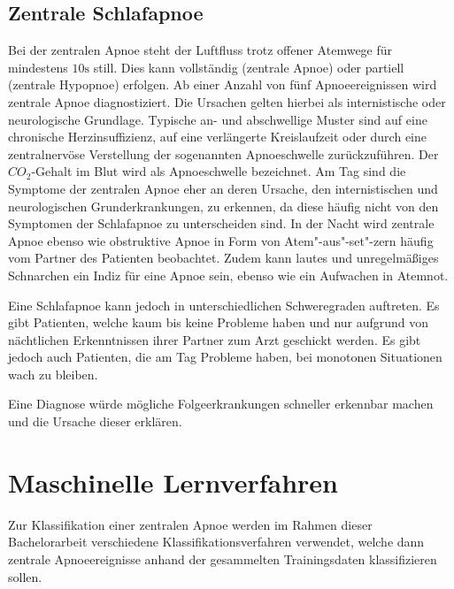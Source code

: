 \subsection{Zentrale Schlafapnoe}
\label{ch:Basics:se:apnoe}
Bei der zentralen Apnoe steht der Luftfluss trotz offener Atemwege für mindestens $10\si{\s}$ still. 
Dies kann vollständig (zentrale Apnoe) oder partiell (zentrale Hypopnoe) erfolgen. 
Ab einer Anzahl von fünf Apnoeereignissen wird zentrale Apnoe diagnostiziert.
Die Ursachen gelten hierbei als internistische oder neurologische Grundlage.
Typische an- und abschwellige Muster sind auf eine chronische Herzinsuffizienz, auf eine verlängerte Kreislaufzeit oder durch eine zentralnervöse Verstellung der sogenannten Apnoeschwelle zurückzuführen.
Der $CO_2$-Gehalt im Blut wird als Apnoeschwelle bezeichnet.
Am Tag sind die Symptome der zentralen Apnoe eher an deren Ursache, den internistischen und neurologischen Grunderkrankungen, zu erkennen, da diese häufig nicht von den Symptomen der Schlafapnoe zu unterscheiden sind. 
In der Nacht wird zentrale Apnoe ebenso wie obstruktive Apnoe in Form von Atem"-aus"-set"-zern häufig vom Partner des Patienten beobachtet.
Zudem kann lautes und unregelmäßiges Schnarchen ein Indiz für eine Apnoe sein, ebenso wie ein Aufwachen in Atemnot.

Eine Schlafapnoe kann jedoch in unterschiedlichen Schweregraden auftreten. 
Es gibt Patienten, welche kaum bis keine Probleme haben und nur aufgrund von nächtlichen Erkenntnissen ihrer Partner zum Arzt geschickt werden. 
Es gibt jedoch auch Patienten, die am Tag Probleme haben, bei monotonen Situationen wach zu bleiben.

Eine Diagnose würde mögliche Folgeerkrankungen schneller erkennbar machen und die Ursache dieser erklären.

\section{Maschinelle Lernverfahren}
\label{ch:Basics:se:ml}
Zur Klassifikation einer zentralen Apnoe werden im Rahmen dieser Bachelorarbeit verschiedene Klassifikationsverfahren verwendet, welche dann zentrale Apnoeereignisse anhand der gesammelten Trainingsdaten klassifizieren sollen.

